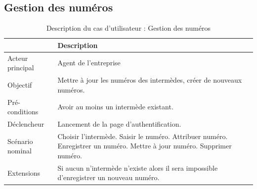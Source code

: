 		\subsection*{Gestion des numéros}
			\begin{table}[H]
				\begin{center}
					{\renewcommand{\arraystretch}{1.5}\begin{tabularx}{\textwidth}{|l|X|}
							\hline & Description \\
							\hline Acteur principal & Agent de l'entreprise \\
							\hline Objectif & Mettre à jour les numéros des intermèdes, créer de nouveaux numéros.\\
							\hline Pré-conditions & Avoir au moins un intermède existant.\\
							\hline Déclencheur & Lancement de la page d'authentification.\\
							\hline
							Scénario nominal &
							Choisir l'intermède.\newline
							Saisir le numéro.\newline
							Attribuer numéro.\newline\newline
							Enregistrer un numéro.\newline
							Mettre à jour numéro.\newline
							Supprimer numéro.\\
							\hline
							Extensions & Si aucun n'intermède n'existe alors il sera impossible d'enregistrer un nouveau numéro. \\ 
							\hline               
					\end{tabularx}}
				\end{center}
				\caption{Description du cas d'utilisateur : Gestion des numéros}
			\end{table}
